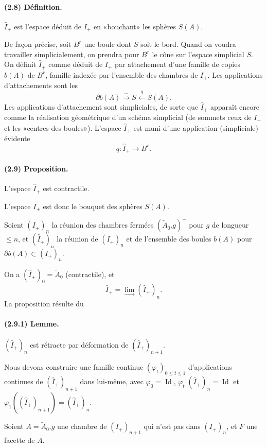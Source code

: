 \documentclass[10pt,a4paper]{article}
\providecommand{\varinjlim}{\mathop{\mathrm{lim}}\limits_{\longrightarrow}}
\begin{document}
\paragraph{(2.8) Définition.} \(\widehat I_+\) est l'espace déduit de \(I_+\) en «bouchant» les sphères \(S(A)\).

De façon précise, soit \(B^r\) une boule dont \(S\) soit le bord. Quand on voudra travailler simplicialement, on prendra pour \(B^r\) le cône sur l'espace simplicial \(S\). On définit \(\widehat I_+\) comme déduit de \(I_+\) par attachement d'une famille de copies \(b(A)\) de \(B^r\), famille indexée par l'ensemble des chambres de \(I_+\). Les applications d'attachements sont les
\[
\partial b(A)\xrightarrow{\sim}S\xleftarrow{q}S(A).
\]
Les applications d'attachement sont simpliciales, de sorte que \(\widehat I_+\) apparaît encore comme la réalisation géométrique d'un schéma simplicial (de sommets ceux de \(I_+\) et les «centres des boules»). L'espace \(\widehat I_+\) est muni d'une application (simpliciale) évidente
\[
q:\widehat I_+\longrightarrow B^r.
\]

\paragraph{(2.9) Proposition.} L'espace \(\widehat I_+\) est contractile.

L'espace \(I_+\) est donc le bouquet des sphères \(S(A)\).

Soient \((I_+)_n\) la réunion des chambres fermées \((\widetilde A_0.g)^{-}\) pour \(g\) de longueur \(\le n\), et \((\widehat I_+)_n\) la réunion de \((I_+)_n\) et de l'ensemble des boules \(b(A)\) pour \(\partial b(A)\subset(I_+)_n\).

On a \((\widehat I_+)_0=\widetilde A_0\) (contractile), et
\[
\widehat I_+=\varinjlim(\widehat I_+)_n.
\]
La proposition résulte du

\paragraph{(2.9.1) Lemme.} \((\widehat I_+)_n\) est rétracte par déformation de \((\widehat I_+)_{n+1}\).

Nous devons construire une famille continue \((\varphi_t)_{0\le t\le1}\) d'applications continues de \((\widehat I_+)_{n+1}\) dans lui-même, avec \(\varphi_0=\operatorname{Id}\), \(\varphi_t|(\widehat I_+)_n=\operatorname{Id}\) et \(\varphi_1((\widehat I_+)_{n+1})=(\widehat I_+)_n\).

Soient \(A=\widetilde A_0.g\) une chambre de \((I_+)_{n+1}\) qui n'est pas dans \((I_+)_n\), et \(F\) une facette de \(A\).
\end{document}

